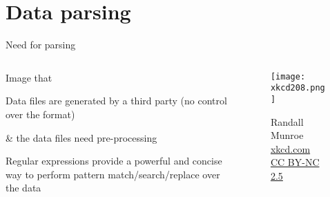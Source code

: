 
\section{Data parsing}

\begin{frame}{Need for parsing}
  \begin{columns}[T]
    \begin{column}{.4\textwidth}
      Image that
      \vspace{0.5cm}
      \begin{arrowlist}
        \itemsep8pt
        \item[]<1-> Data files are generated by a third party (no control
          over the format)
        \item[]<2-> \& the data files need pre-processing
          \vspace{0.3cm}
        \item<3-> Regular expressions provide a powerful and concise way
          to perform pattern match/search/replace over the data
      \end{arrowlist}

    \end{column}
    \begin{column}{.6\textwidth}
      \begin{figure}
        \texttt{[image: xkcd208.png]}
        \caption*{\tiny  \textcopyright Randall Munroe \href{http://xkcd.com/208/}{xkcd.com} \href{http://creativecommons.org/licenses/by-nc/2.5/}{CC BY-NC 2.5}}
      \end{figure}
    \end{column}    

  \end{columns}
\end{frame}

